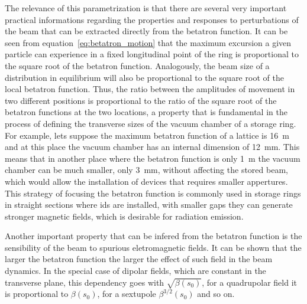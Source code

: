 	The relevance of this parametrization is that there are several very important practical informations regarding the properties and responses to perturbations of the beam that can be extracted directly from the betatron function. It can be seen from equation~\eqref{eq:betatron_motion} that the maximum excursion a given particle can experience in a fixed longitudinal point of the ring is proportional to the square root of the betatron function. Analogously, the beam size of a distribution in equilibrium will also be proportional to the square root of the local betatron function. Thus, the ratio between the amplitudes of movement in two different positions is proportional to the ratio of the square root of the betatron functions at the two locations, a property that is fundamental in the process of defining the transverse sizes of the vacuum chamber of a storage ring. For example, lets suppose the maximum betatron function of a lattice is \SI{16}{\meter} and at this place the vacuum chamber has an internal dimension of \SI{12}{\milli\meter}. This means that in another place where the betatron function is only \SI{1}{\meter} the vacuum chamber can be much smaller, only \SI{3}{\milli\meter}, without affecting the stored beam, which would allow the installation of devices that requires smaller appertures. This strategy of focusing the betatron function is commonly used in storage rings in straight sections where \gls{ids} are installed, with smaller gaps they can generate stronger magnetic fields, which is desirable for radiation emission.

	Another important property that can be infered from the betatron function is the sensibility of the beam to spurious eletromagnetic fields. It can be shown that the larger the betatron function the larger the effect of such field in the beam dynamics. In the special case of dipolar fields, which are constant in the transverse plane, this dependency goes with $\sqrt{\beta(s_0)}$, for a quadrupolar field it is proportional to $\beta(s_0)$, for a sextupole $\beta^{3/2}(s_0)$ and so on.

